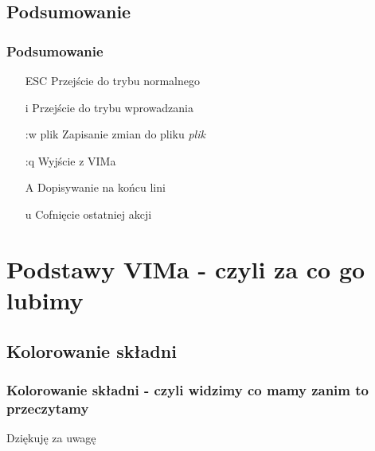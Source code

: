 \documentclass{beamer}
\begin{document}
\subsection{Podsumowanie}
\begin{frame}
	\frametitle{Podsumowanie}
	\begin{enumerate}
		\item [ESC] Przejście do trybu normalnego
		\item [i] Przejście do trybu wprowadzania
		\item [:w plik] Zapisanie zmian do pliku \textit{plik}
		\item [:q] Wyjście z VIMa
		\item [A] Dopisywanie na końcu lini
		\item [u] Cofnięcie ostatniej akcji
	\end{enumerate}
\end{frame}
\section{Podstawy VIMa - czyli za co go lubimy}
\subsection{Kolorowanie składni}
\begin{frame}
	\frametitle{Kolorowanie składni - czyli widzimy co mamy zanim to przeczytamy}
\end{frame}
\begin{frame}
	Dziękuję za uwagę
\end{frame}
\end{document}
